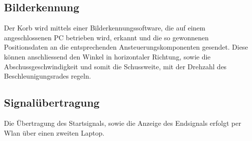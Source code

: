 \subsection{Bilderkennung}
Der Korb wird mittels einer Bilderkennungssoftware, die auf einem 
angeschlossenen PC betrieben wird, erkannt und die so gewonnenen 
Positionsdaten an die entsprechenden Ansteuerungskomponenten gesendet. Diese 
können anschliessend den Winkel in horizontaler Richtung, sowie die 
Abschussgeschwindigkeit und somit die Schussweite, mit der Drehzahl des 
Beschleunigungsrades regeln.

\subsection{Signalübertragung}
Die Übertragung des Startsignals, sowie die Anzeige des Endsignals erfolgt per 
Wlan über einen zweiten Laptop.
